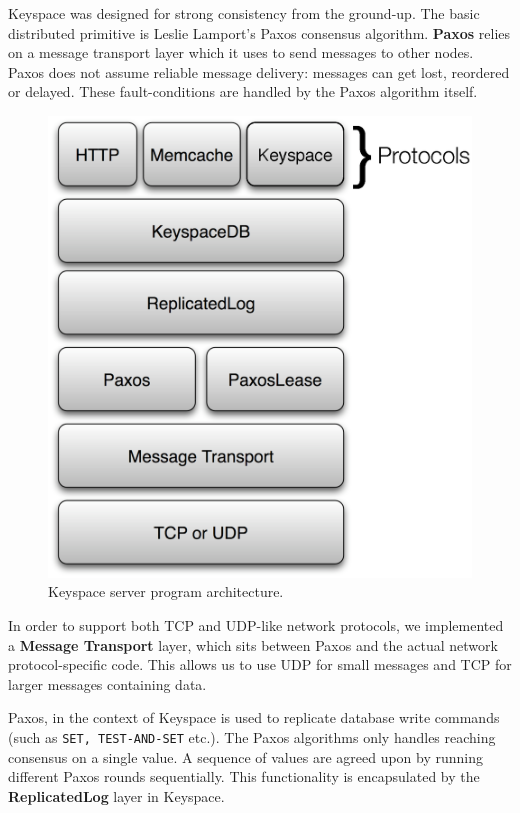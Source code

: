 \documentclass[12pt]{article}
\begin{document}
Keyspace was designed for strong consistency from the ground-up. The basic distributed primitive is Leslie Lamport's Paxos consensus algorithm. \textbf{Paxos} relies on a message transport layer which it uses to send messages to other nodes. Paxos does not assume reliable message delivery: messages can get lost, reordered or delayed. These fault-conditions are handled by the Paxos algorithm itself.

\begin{figure}[htbp]
\begin{center}
\includegraphics[scale=0.5]{arch1.eps}
\caption{Keyspace server program architecture.}
\end{center}
\end{figure}

In order to support both TCP and UDP-like network protocols, we implemented a \textbf{Message Transport} layer, which sits between Paxos and the actual network protocol-specific code. This allows us to use UDP for small messages and TCP for larger messages containing data.

Paxos, in the context of Keyspace is used to replicate database write commands (such as \texttt{SET, TEST-AND-SET} etc.). The Paxos algorithms only handles reaching consensus on a single value. A sequence of values are agreed upon by running different Paxos rounds sequentially. This functionality is encapsulated by the \textbf{ReplicatedLog} layer in Keyspace.
\end{document}
